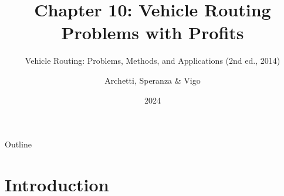 \documentclass[aspectratio=169,10pt]{beamer}
\title[Ch.\,10: VRP with Profits]{Chapter 10: Vehicle Routing Problems with Profits}
\subtitle{Vehicle Routing: Problems, Methods, and Applications (2nd ed., 2014)}
\author{Archetti, Speranza \& Vigo}
\institute{Lecture notes prepared for self-study}
\date{2024}
\begin{document}

\begin{frame}
  \titlepage
\end{frame}

\begin{frame}[allowframebreaks]{Outline}
  \tableofcontents
\end{frame}

\section{Introduction}
\end{document}
